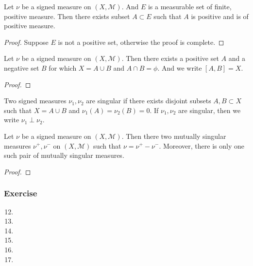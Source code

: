 \begin{lemma}[Hahn]
	Let $\nu$ be a signed measure on $(X,\mathcal{M})$.
	And $E$ is a measurable set of finite, positive measure.
	Then there exists subset $A \subset E$ such that $A$ is positive and is of positive measure.
\end{lemma}
\begin{proof}
	Suppose $E$ is not a positive set, otherwise the proof is complete.
\end{proof}

\begin{theorem}
	Let $\nu$ be a signed measure on $(X,\mathcal{M})$.
	Then there exists a positive set $A$ and a negative set $B$ for which $ X = A \cup B$ and $A \cap B = \phi$.
	And we write $[A,B] = X$.
\end{theorem}
\begin{proof}
\end{proof}

\begin{definition}
	Two signed measures $\nu_1,\nu_2$ are singular if there exists disjoint subsets $A,B \subset X$ such that $X = A \cup B$ and $\nu_1(A) = \nu_2(B) = 0$.
	If $\nu_1,\nu_2$ are singular, then we write $\nu_1 \perp \nu_2$.
\end{definition}

\begin{theorem}
	Let $\nu$ be a signed measure on $(X,\mathcal{M})$.
	Then there two mutually singular measures $\nu^+,\nu^-$ on $(X,\mathcal{M})$ such that $\nu = \nu^+ - \nu^-$.
	Moreover, there is only one such pair of mutually singular measures.
\end{theorem}
\begin{proof}
\end{proof}

\subsubsection{Exercise}
\begin{enumerate}
	\setcounter{enumi}{11}
	\item
	\item
	\item
	\item
	\item
	\item
\end{enumerate}

